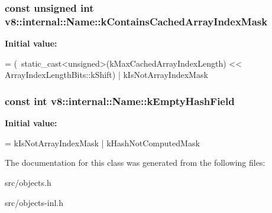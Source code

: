 \subsubsection[{k\+Contains\+Cached\+Array\+Index\+Mask}]{\setlength{\rightskip}{0pt plus 5cm}const unsigned int v8\+::internal\+::\+Name\+::k\+Contains\+Cached\+Array\+Index\+Mask\hspace{0.3cm}{\ttfamily [static]}}\label{classv8_1_1internal_1_1_name_ae0af5213bf45a48b36de81433c7c31ad}
{\bfseries Initial value\+:}
\begin{DoxyCode}
=
      (~static\_cast<\textcolor{keywordtype}{unsigned}>(kMaxCachedArrayIndexLength)
       << ArrayIndexLengthBits::kShift) |
      kIsNotArrayIndexMask
\end{DoxyCode}
\hypertarget{classv8_1_1internal_1_1_name_a2a35367ed3cb3999a8e6d3d46680b816}{}
\subsubsection[{k\+Empty\+Hash\+Field}]{\setlength{\rightskip}{0pt plus 5cm}const int v8\+::internal\+::\+Name\+::k\+Empty\+Hash\+Field\hspace{0.3cm}{\ttfamily [static]}}\label{classv8_1_1internal_1_1_name_a2a35367ed3cb3999a8e6d3d46680b816}
{\bfseries Initial value\+:}
\begin{DoxyCode}
=
      kIsNotArrayIndexMask | kHashNotComputedMask
\end{DoxyCode}


The documentation for this class was generated from the following files\+:\begin{DoxyCompactItemize}
\item 
src/objects.\+h\item 
src/objects-\/inl.\+h\end{DoxyCompactItemize}
